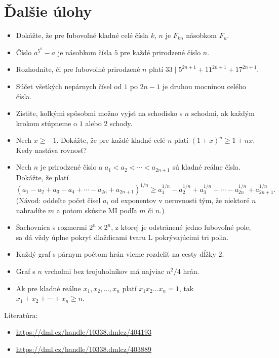 \documentclass[a4paper, 11pt]{article}
\begin{document}
\section{Ďalšie úlohy}

\begin{itemize}
\item Dokážte, že pre ľubovoľné kladné celé čísla $k$, $n$ je $F_{kn}$ násobkom $F_n$.
\item Číslo $a^{5^n}-a$ je násobkom čísla $5$ pre každé prirodzené číslo $n$.
\item Rozhodnite, či pre ľubovoľné prirodzené $n$ platí $33\mid 5^{2n+1}+11^{2n+1}+17^{2n+1}$.
\item Súčet všetkých nepárnych čísel od $1$ po $2n-1$ je druhou mocninou celého čísla.
\item Zistite, koľkými spôsobmi možno vyjsť na schodisko s $n$ schodmi, ak každým krokom stúpneme o $1$ alebo $2$ schody.
\item Nech $x\ge -1$. Dokážte, že pre každé kladné celé $n$ platí $(1+x)^n\ge 1+nx$. Kedy nastáva rovnosť?
\item Nech $n$ je prirodzené číslo a $a_1<a_2<\cdots<a_{2n+1}$ sú kladné reálne čísla. Dokážte, že platí
$$
(a_1-a_2+a_3-a_4+\cdots-a_{2n}+a_{2n+1})^{1/n}\ge a_1^{1/n}-a_2^{1/n}+a_3^{1/n}-\cdots-a_{2n}^{1/n}+a_{2n+1}^{1/n}.
$$
(Návod: oddeľte počet čísel $a_i$ od exponentov v nerovnosti tým, že niektoré $n$ nahradíte $m$ a potom skúsite MI podľa $m$ či $n$.)
\item Šachovnica s rozmermi $2^n \times 2^n$, z ktorej je odstránené jedno ľubovoľné pole, sa dá vždy úplne pokryť dlaždicami tvaru L pokrývajúcimi tri polia.
\item Každý graf s párnym počtom hrán vieme rozdeliť na cesty dĺžky $2$.
\item Graf s $n$ vrcholmi bez trojuholníkov má najviac $n^2/4$ hrán.
\item Ak pre kladné reálne $x_1, x_2, \dots, x_n$ platí $x_1x_2\dots x_n = 1$, tak $x_1+x_2+\cdots+x_n \ge n$.
\end{itemize}


Literatúra:
\begin{itemize}
\item {\small \url{https://dml.cz/handle/10338.dmlcz/404193}}
\item {\small \url{https://dml.cz/handle/10338.dmlcz/403889}}
\end{itemize}
\end{document}
